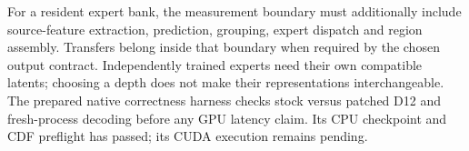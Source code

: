 For a resident expert bank, the measurement boundary must additionally include
source-feature extraction, prediction, grouping, expert dispatch and region
assembly. Transfers belong inside that boundary when required by the chosen
output contract. Independently trained experts need their own compatible
latents; choosing a depth does not make their representations interchangeable.
The prepared native correctness harness checks stock versus patched D12 and
fresh-process decoding before any GPU latency claim. Its CPU checkpoint and
CDF preflight has passed; its CUDA execution remains pending.

